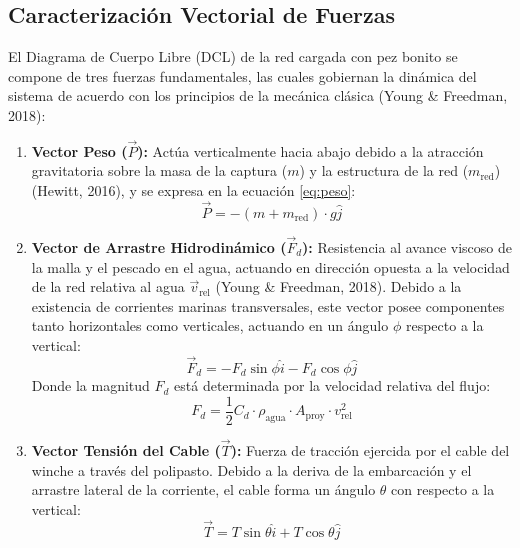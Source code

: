 \documentclass[11pt,a4paper]{article}
\begin{document}
\subsection{Caracterización Vectorial de Fuerzas}
El Diagrama de Cuerpo Libre (DCL) de la red cargada con pez bonito se compone de tres fuerzas fundamentales, las cuales gobiernan la dinámica del sistema de acuerdo con los principios de la mecánica clásica (Young \& Freedman, 2018):
\begin{enumerate}
    \item \textbf{Vector Peso ($\vec{P}$):} Actúa verticalmente hacia abajo debido a la atracción gravitatoria sobre la masa de la captura ($m$) y la estructura de la red ($m_{\text{red}}$) (Hewitt, 2016), y se expresa en la ecuación \eqref{eq:peso}:
    \begin{equation}\label{eq:peso}
    \vec{P} = -(m + m_{\text{red}}) \cdot g \hat{j}
    \end{equation}
    \item \textbf{Vector de Arrastre Hidrodinámico ($\vec{F}_d$):} Resistencia al avance viscoso de la malla y el pescado en el agua, actuando en dirección opuesta a la velocidad de la red relativa al agua $\vec{v}_{\text{rel}}$ (Young \& Freedman, 2018). Debido a la existencia de corrientes marinas transversales, este vector posee componentes tanto horizontales como verticales, actuando en un ángulo $\phi$ respecto a la vertical:
    \begin{equation}\label{eq:arrastre_vec}
    \vec{F}_d = -F_d \sin\phi \hat{i} - F_d \cos\phi \hat{j}
    \end{equation}
    Donde la magnitud $F_d$ está determinada por la velocidad relativa del flujo:
    \begin{equation}\label{eq:arrastre_mag_teorica}
    F_d = \frac{1}{2} C_d \cdot \rho_{\text{agua}} \cdot A_{\text{proy}} \cdot v_{\text{rel}}^2
    \end{equation}
    \item \textbf{Vector Tensión del Cable ($\vec{T}$):} Fuerza de tracción ejercida por el cable del winche a través del polipasto. Debido a la deriva de la embarcación y el arrastre lateral de la corriente, el cable forma un ángulo $\theta$ con respecto a la vertical:
    \begin{equation}\label{eq:tension_vec}
    \vec{T} = T \sin\theta \hat{i} + T \cos\theta \hat{j}
    \end{equation}
\end{enumerate}
\end{document}

